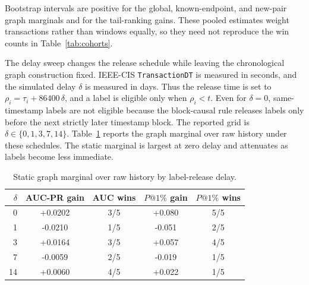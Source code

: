 \documentclass[11pt]{article}
\theoremstyle{definition}
\theoremstyle{remark}
\begin{document}
\begin{table}[h]
\centering
\caption{Paired chronological-block bootstrap confidence intervals over pooled test transactions.}
\label{tab:bootstrap-ci}
\end{table}

Bootstrap intervals are positive for the global, known-endpoint, and new-pair graph marginals and for the tail-ranking gains. These pooled estimates weight transactions rather than windows equally, so they need not reproduce the win counts in Table~\ref{tab:cohorts}.

The delay sweep changes the release schedule while leaving the chronological graph construction fixed. IEEE-CIS \texttt{TransactionDT} is measured in seconds, and the simulated delay $\delta$ is measured in days. Thus the release time is set to $\rho_i=\tau_i+86400\,\delta$, and a label is eligible only when $\rho_i<t$. Even for $\delta=0$, same-timestamp labels are not eligible because the block-causal rule releases labels only before the next strictly later timestamp block. The reported grid is $\delta\in\{0,1,3,7,14\}$. Table~\ref{tab:delay-static} reports the graph marginal over raw history under these schedules. The static marginal is largest at zero delay and attenuates as labels become less immediate.

\begin{table}[h]
\centering
\caption{Static graph marginal over raw history by label-release delay.}
\label{tab:delay-static}
\begin{tabular}{rcccc}
\toprule
$\delta$ & AUC-PR gain & AUC wins & $P@1\%$ gain & $P@1\%$ wins \\
\midrule
0 & +0.0202 & 3/5 & +0.080 & 5/5 \\
1 & -0.0210 & 1/5 & -0.051 & 2/5 \\
3 & +0.0164 & 3/5 & +0.057 & 4/5 \\
7 & -0.0059 & 2/5 & -0.019 & 1/5 \\
14 & +0.0060 & 4/5 & +0.022 & 1/5 \\
\bottomrule
\end{tabular}
\end{table}
\end{document}
